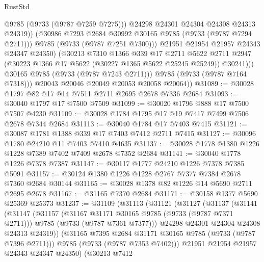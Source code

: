\begin{lexlean}{RustStd}
\begin{coremodule}
                          @9785
                          (@9733 (@9787 @7259 @7275)))
                        @24298
                        @24301
                        @24304
                        @24308
                        @24313
                        @24319))
                    (@30986 @7293 @2684 @30992 @30165 @9785 (@9733 (@9787 @7294 @2711)))
                    @9785
                    (@9733 (@9787 @7251 @7300)))
                  @21951
                  @21954
                  @21957
                  @24343
                  @24347
                  @24350)
                (@30213
                  @7310
                  @1366
                  @339
                  @17
                  @2711
                  @5622
                  @2711
                  @2947
                  (@30223 @1366 @17 @5622 (@30227 @1365 @5622 @25245 @25249))
                  @30241)))
            @30165
            @9785
            (@9733 (@9787 @7243 @2711)))
          @9785
          (@9733 (@9787 @7164 @7318)))
        @20043
        @20046
        @20049
        @20053
        @20058
        @20064))
@31089 := @30028 @1797 @82 @17 @14 @7511 @2711 @2695 @2678 @7336 @2684
@31093 := @30040 @1797 @17 @7500 @7509
@31099 := @30020 @1796 @888 @17 @7500 @7507 @4230
@31109 := @30028 @1784 @1795 @17 @19 @7417 @7499 @7506 @2678 @7344 @2684
@31113 := @30040 @1784 @17 @7403 @7415
@31121 := @30087 @1781 @1388 @339 @17 @7403 @7412 @2711 @7415
@31127 := @30096 @1780 @24210 @11 @7403 @7410 @4635
@31137 := @30028 @1778 @1380 @1226 @1228 @7389 @7402 @7409 @2678 @7352 @2684
@31141 := @30040 @1778 @1226 @7378 @7387
@31147 := @30117 @1777 @24210 @1226 @7378 @7385 @5091
@31157 := @30124 @1380 @1226 @1228 @2767 @7377 @7384 @2678 @7360 @2684 @30144
@31165 := @30028 @1378 @82 @1226 @14 @5690 @2711 @2695 @2678
@31167 := @31165 @7370 @2684
@31171 := @30158 @1377 @5690 @25369 @25373
@31237 := @31109
    (@31113
      (@31121
        (@31127
          (@31137
            (@31141
              (@31147
                (@31157
                  (@31167 @31171 @30165 @9785 (@9733 (@9787 @7371 @2711)))
                  @9785
                  (@9733 (@9787 @7361 @7377)))
                @24298
                @24301
                @24304
                @24308
                @24313
                @24319))
            (@31165 @7395 @2684 @31171 @30165 @9785 (@9733 (@9787 @7396 @2711)))
            @9785
            (@9733 (@9787 @7353 @7402)))
          @21951
          @21954
          @21957
          @24343
          @24347
          @24350)
        (@30213
          @7412

\end{coremodule}
\end{lexlean}
